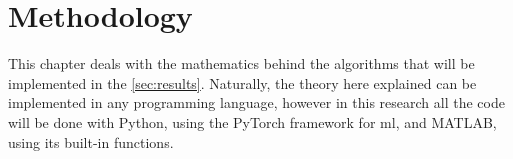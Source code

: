 \chapter{Methodology}\label{sec:methodology}

This chapter deals with the mathematics behind the algorithms that will be implemented in the \cref{sec:results}. Naturally, the theory here explained can be implemented in any programming language, however in this research all the code will be done with Python, using the PyTorch framework for \gls*{ml}, and MATLAB, using its built-in functions.